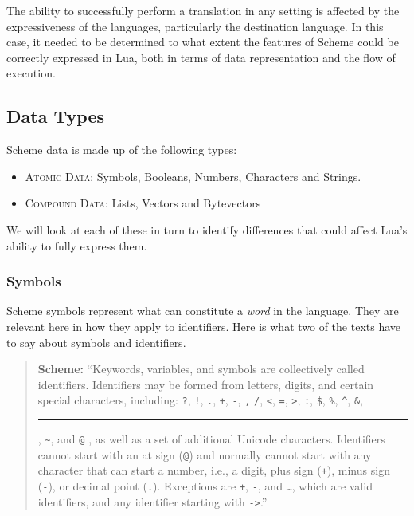 The ability to successfully perform a translation in any setting is affected by
the expressiveness of the languages, particularly the destination language. In
this case, it needed to be determined to what extent the features of Scheme
could be correctly expressed in Lua, both in terms of data representation and
the flow of execution.

\subsection{Data Types}

Scheme data is made up of the following types:~\cite[App:(Formal~Syntax)]{tspl}
\begin{itemize}
\item \textsc{Atomic Data}: Symbols, Booleans, Numbers, Characters and Strings.
\item \textsc{Compound Data}: Lists, Vectors and Bytevectors
\end{itemize}

We will look at each of these in turn to identify differences that could affect
Lua's ability to fully express them.

\subsubsection{Symbols}

Scheme symbols represent what can constitute a \emph{word} in the language. They
are relevant here in how they apply to identifiers. Here is what two of the
texts have to say about symbols and identifiers.

\begin{quote}\textbf{Scheme:}
``Keywords, variables, and symbols are collectively called identifiers.
Identifiers may be formed from letters, digits, and certain special characters,
including: \texttt ?, \texttt !, \texttt ., \texttt +, \texttt -, \texttt *,
\texttt /, \texttt <, \texttt =, \texttt >, \texttt :, \texttt \$, \texttt \%,
\texttt \^{}, \texttt \&, \rule{3mm}{0.2mm}, \texttt \~{}, and \texttt @ , as
well as a set of additional Unicode characters.  Identifiers cannot start with
an at sign (\texttt @) and normally cannot start with any character that can
start a number, i.e., a digit, plus sign (\texttt +), minus sign (\texttt -), or
decimal point (\texttt .). Exceptions are \texttt +, \texttt -, and \texttt
\ldots, which are valid identifiers, and any identifier starting with
\texttt{->}.''~\cite[Sec~1.1]{tspl}
\end{quote}


